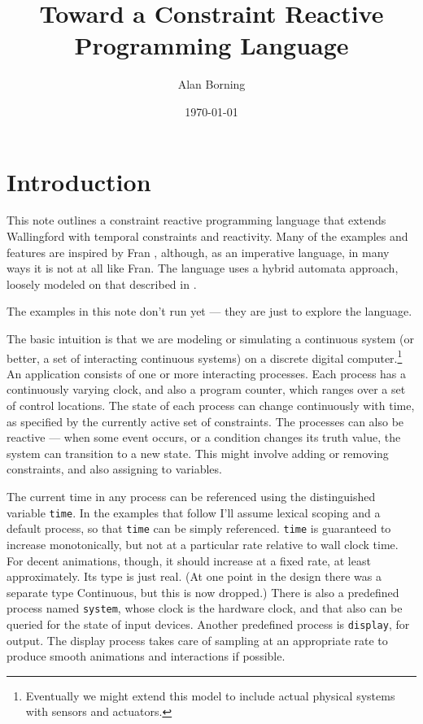 \documentclass{article}
\begin{document}
\title{Toward a Constraint Reactive Programming Language}
\author{Alan Borning}
\date{\today}

\maketitle

\section{Introduction}

This note outlines a constraint reactive programming language that
extends Wallingford with temporal constraints and reactivity.  Many of
the examples and features are inspired by Fran \cite{elliot-icfp-1997},
although, as an imperative language, in many ways it is not at all
like Fran.  The language uses a hybrid automata approach, loosely
modeled on that described in \cite{alur-lncs-1993}.

The examples in this note don't run yet --- they are just to explore
the language.

The basic intuition is that we are modeling or simulating a continuous
system (or better, a set of interacting continuous systems) on a
discrete digital computer.\footnote{Eventually we might extend this
  model to include actual physical systems with sensors and
  actuators.}  An application consists of one or more interacting
processes.  Each process has a continuously varying clock, and also a
program counter, which ranges over a set of control locations.  The
state of each process can change continuously with time, as specified
by the currently active set of constraints.  The processes can also be
reactive --- when some event occurs, or a condition changes its truth
value, the system can transition to a new state.  This might involve
adding or removing constraints, and also assigning to variables.

The current time in any process can be referenced using the distinguished
variable \verb|time|.  In the examples that follow I'll assume lexical
scoping and a default process, so that \verb|time| can be simply
referenced.  \verb|time| is guaranteed to increase monotonically, but not
at a particular rate relative to wall clock time.  For decent animations,
though, it should increase at a fixed rate, at least approximately.  Its
type is just real.  (At one point in the design there was a separate type
Continuous, but this is now dropped.)  There is also a predefined process
named \verb|system|, whose clock is the hardware clock, and that also can
be queried for the state of input devices.  Another predefined process is
\verb|display|, for output.  The display process takes care of sampling at
an appropriate rate to produce smooth animations and interactions if
possible.
\end{document}
